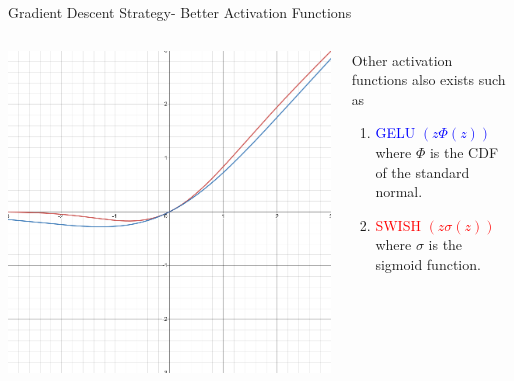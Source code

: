 \begin{frame}{Gradient Descent Strategy- Better Activation Functions}
	\begin{columns}[T]
        \begin{column}{0.5\textwidth}
        	\includegraphics[width=\textwidth]{images/SWISH.png}
        \end{column}
	    \begin{column}{0.5\textwidth}
    	    Other activation functions also exists such as 
			\begin{enumerate}[$\bullet$]
				\item \textcolor{blue}{GELU $\left(z\Phi(z)\right)$}where $\Phi$ is the CDF of the standard normal.
				\item \textcolor{red}{SWISH $\left(z\sigma(z)\right)$}where $\sigma$ is the sigmoid function.
			\end{enumerate}
    	\end{column}
    \end{columns}
\end{frame}


